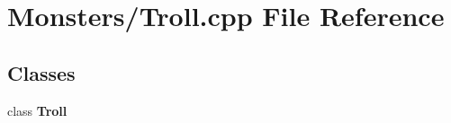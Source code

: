 \section{Monsters/\-Troll.cpp File Reference}
\label{_troll_8cpp}
\subsection*{Classes}
\begin{DoxyCompactItemize}
\item 
class {\bf Troll}
\end{DoxyCompactItemize}
